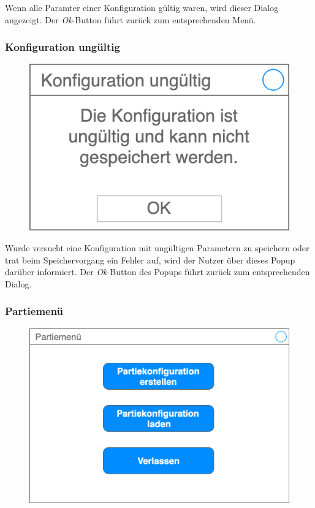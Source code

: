     Wenn alle Paramter einer Konfiguration gültig waren, wird dieser Dialog angezeigt. Der \textit{Ok}-Button führt zurück zum entsprechenden Menü.

    \subsubsection{Konfiguration ungültig}

    \begin{figure}[H]
        \centering
        \includegraphics[width=\textwidth/2]{images/konfiguration_ungueltig}
    \end{figure}

    Wurde versucht eine Konfiguration mit ungültigen Parametern zu speichern oder trat beim Speichervorgang ein Fehler auf, wird der Nutzer über dieses Popup darüber informiert. Der \textit{Ok}-Button des Popups führt zurück zum entsprechenden Dialog.

    \subsubsection{Partiemenü}

    \begin{figure}[H]
        \centering
        \includegraphics[width=\textwidth/2]{images/partiemenue}
    \end{figure}


